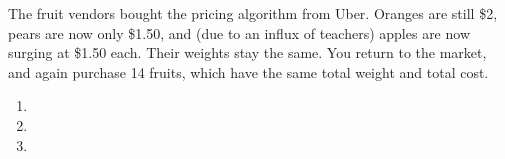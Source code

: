 The fruit vendors bought the pricing algorithm from Uber. Oranges are still \$2, pears are now only \$1.50, and (due to an influx of teachers) apples are now surging at \$1.50 each. Their weights stay the same. You return to the market, and again purchase 14 fruits, which have the same total weight and total cost.

\begin{enumerate}
    \item 
    \item 
    \item 
\end{enumerate}